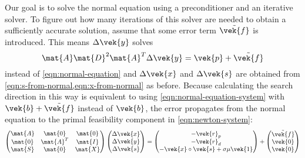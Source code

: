 Our goal is to solve the normal equation using a preconditioner and an iterative solver.
To figure out how many iterations of this solver are needed to obtain a sufficiently accurate solution, assume that some error term \(\tilde{\vek{f}}\) is introduced.
This means \(\Delta\vek{y}\) solves
\begin{equation}
 \mat{A} \mat{D}^2 \mat{A}^T \Delta\vek{y} = \vek{p} + \tilde{\vek{f}}
\end{equation}
instead of \cref{eqn:normal-equation} and \(\Delta\vek{x}\) and \(\Delta\vek{s}\) are obtained from \cref{eqn:s-from-normal,eqn:x-from-normal} as before.
Because calculating the search direction in this way is equivalent to using \cref{eqn:normal-equation-system} with \(\vek{b} + \tilde{\vek{f}}\) instead of \(\vek{b}\),
the error propagates from the normal equation to the primal feasibility component in \cref{eqn:newton-system}:
\begin{equation}
  \begin{pmatrix}
    \mat{A} & \mat{0}   & \mat{0} \\
    \mat{0} & \mat{A}^T & \mat{I} \\
    \mat{S} & \mat{0}   & \mat{X} \\
  \end{pmatrix}
  \begin{pmatrix} \Delta\vek{x} \\ \Delta\vek{y} \\ \Delta\vek{s} \end{pmatrix}
  =
  \begin{pmatrix} -\vek{r}_p \\ -\vek{r}_d \\ -\vek{x} \circ \vek{s} + \sigma \mu \vek{1} \end{pmatrix}
  +
  \begin{pmatrix} \tilde{\vek{f}} \\ \vek{0} \\ \vek{0} \end{pmatrix}
\end{equation}

